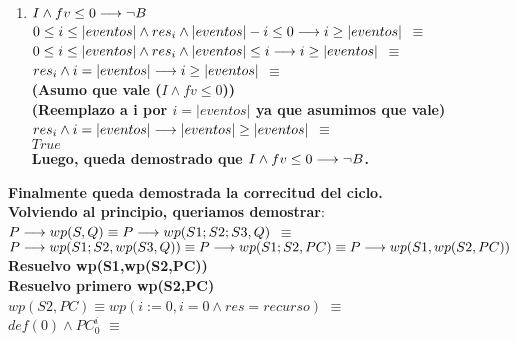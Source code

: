 \documentclass[10pt,a4paper]{article}
\begin{document}
\begin{flushleft}
\begin{enumerate}
	\item \textbf{$I \wedge fv\leq0 \longrightarrow \neg B$} \\
	\vspace{2mm}
	$0\leq i \leq |eventos| \wedge res_i \wedge |eventos|-i \leq 0 \longrightarrow i \geq |eventos|$ $\equiv$ \\
	\vspace{2mm}
	$0\leq i \leq |eventos| \wedge res_i \wedge |eventos| \leq i \longrightarrow i \geq |eventos|$ $\equiv$ \\
	\vspace{2mm}
	$ res_i \wedge i= |eventos| \longrightarrow i \geq |eventos|$ $\equiv$ \\
	\vspace{2mm}
	\textbf{(Asumo que vale ($I \wedge fv\leq0$)) }\\
	\vspace{2mm}
	\textbf{(Reemplazo a i por $i=|eventos|$ ya que asumimos que vale)}\\
	\vspace{2mm}
	$res_i \wedge i=|eventos| \longrightarrow |eventos| \geq |eventos|$ $\equiv$ \\
	$True$ \\
	\vspace{3mm}
	\textbf{Luego, queda demostrado que $I \wedge fv\leq0 \longrightarrow \neg B$.}
\end{enumerate}
\textbf{Finalmente queda demostrada la correcitud del ciclo.}\\
\vspace{6mm}
\textbf{Volviendo al principio, queriamos demostrar}:\\
\vspace{2mm}
$P \longrightarrow wp(S,Q) \equiv P\longrightarrow wp(S1;S2;S3,Q)$ $ \equiv$\\
\vspace{2mm}
$P\longrightarrow wp(S1;S2,wp(S3,Q)) \equiv P\longrightarrow wp(S1;S2,PC) \equiv P\longrightarrow wp(S1,wp(S2,PC)) $\\
\vspace{4mm}
\textbf{Resuelvo wp(S1,wp(S2,PC))}\\
\vspace{4mm}
\textbf{Resuelvo primero wp(S2,PC)}\\
\vspace{2mm}
$wp(S2,PC) \equiv wp(i:=0,i=0 \wedge res=recurso)$ $\equiv$\\
\vspace{2mm}
$def (0) \wedge PC_{0}^{i}$ $\equiv$\\
\vspace{2mm}

\end{flushleft}
\end{document}
